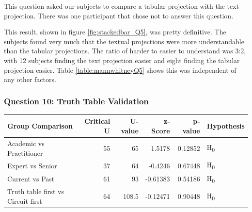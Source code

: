 This question asked our subjects to compare a tabular projection with the text projection.
There was one participant that chose not to answer this question.

This result, shown in figure \ref{fig:stackedbar_Q5}, was pretty definitive.
The subjects found very much that the textual projections were more understandable than the tabular projections.
The ratio of harder to easier to understand was 3:2, with 12 subjects finding the text projection easier and eight finding the tabular projection easier.
Table \ref{table:mannwhitneyQ5} shows this was independent of any other factors.

\subsubsection{Question 10: Truth Table Validation}
\noindent\begin{minipage}{\linewidth}
    \centering
    \label{fig:stackedbar_Q6}

    \begin{tabular}{ |l ||r |r |r | r|l | } 
        \hline
        Group Comparison                   & Critical U & U-value & z-Score  & p-value & Hypothesis         \\
        \hline
        \hline
        Academic vs Practitioner           &  55        & 65      & 1.5178   & 0.12852 & H\textsubscript{0} \\ 
        \hline
        Expert vs Senior                   &  37        & 64      & -0.4246  & 0.67448 & H\textsubscript{0} \\ 
        \hline
        Current vs Past                    &  61        & 93      & -0.61383 & 0.54186 & H\textsubscript{0} \\ 
        \hline
        Truth table first vs Circuit first &  64        & 108.5   & -0.12471 & 0.90448 & H\textsubscript{0} \\ 
        \hline
    \end{tabular}
    \label{table:mannwhitneyQ6}
\end{minipage} 

